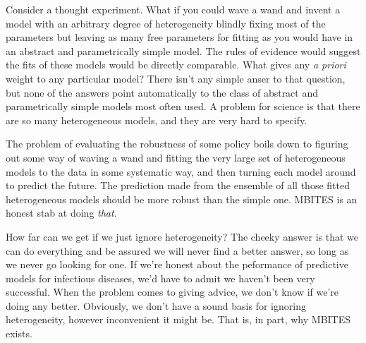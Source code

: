 \documentclass{article}
\begin{document}
Consider a thought experiment. What if you could wave a wand and invent a model with an arbitrary degree of heterogeneity blindly fixing most of the parameters but leaving as many free parameters for fitting as you would have in an abstract and parametrically simple model. The rules of evidence would suggest the fits of these  models would be directly comparable. What gives any {\em a priori} weight to any particular model? There isn't any simple anser to that question, but none of the answers point automatically to the class of abstract and parametrically simple models most often used. A problem for science is that there are so many heterogeneous models, and they are very hard to specify. 

The problem of evaluating the robustness of some policy boils down to figuring out some way of waving a wand and fitting the very large set of heterogeneous models to the data in some systematic way, and then turning each model around to predict the future. The prediction made from the ensemble of all those fitted heterogeneous models should be more robust than the simple one. MBITES is an honest stab at doing {\em that}. 

How far can we get if we just ignore heterogeneity? The cheeky answer is that we can do everything and be assured we will never find a better answer, so long as we never go looking for one. If we're honest about the peformance of predictive models for infectious diseases, we'd have to admit we haven't been very successful. When the problem comes to giving advice, we don't know if we're doing any better.  Obviously, we don't have a sound basis for ignoring heterogeneity, however inconvenient it might be. That is, in part, why MBITES exists. 
\end{document}
